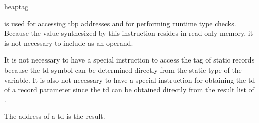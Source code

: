 \begin{instruction}{heaptag}

  \begin{notes}
     is used for accessing \ac{tbp} addresses and for
    performing runtime type checks.  Because the value synthesized by
    this instruction resides in read-only memory, it is not necessary
    to include  as an operand.

    It is not necessary to have a special instruction to access the
    tag of static records because the \ac{td} symbol can be determined
    directly from the static type of the variable.  It is also not
    necessary to have a special instruction for obtaining the \ac{td}
    of a \byref record parameter since the \ac{td} can be obtained
    directly from the result list of .
  \end{notes}

  \begin{results}
  \item The address of a \ac{td} is the result.
  \end{results}

  \begin{operands}
  \item {}
  \item {}
  \end{operands}
\end{instruction}

